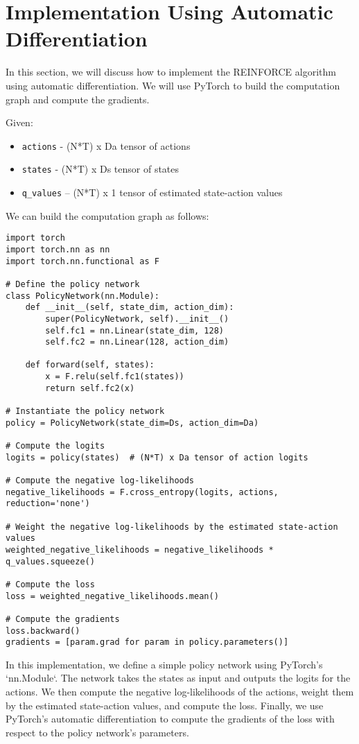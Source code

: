 \documentclass[12pt]{article}
\begin{document}
\section{Implementation Using Automatic Differentiation}

In this section, we will discuss how to implement the REINFORCE algorithm using automatic differentiation. We will use PyTorch to build the computation graph and compute the gradients.

Given:
\begin{itemize}
    \item \texttt{actions} - (N*T) x Da tensor of actions
    \item \texttt{states} - (N*T) x Ds tensor of states
    \item \texttt{q\_values} – (N*T) x 1 tensor of estimated state-action values
\end{itemize}

We can build the computation graph as follows:

\begin{verbatim}
import torch
import torch.nn as nn
import torch.nn.functional as F

# Define the policy network
class PolicyNetwork(nn.Module):
    def __init__(self, state_dim, action_dim):
        super(PolicyNetwork, self).__init__()
        self.fc1 = nn.Linear(state_dim, 128)
        self.fc2 = nn.Linear(128, action_dim)

    def forward(self, states):
        x = F.relu(self.fc1(states))
        return self.fc2(x)

# Instantiate the policy network
policy = PolicyNetwork(state_dim=Ds, action_dim=Da)

# Compute the logits
logits = policy(states)  # (N*T) x Da tensor of action logits

# Compute the negative log-likelihoods
negative_likelihoods = F.cross_entropy(logits, actions, reduction='none')

# Weight the negative log-likelihoods by the estimated state-action values
weighted_negative_likelihoods = negative_likelihoods * q_values.squeeze()

# Compute the loss
loss = weighted_negative_likelihoods.mean()

# Compute the gradients
loss.backward()
gradients = [param.grad for param in policy.parameters()]
\end{verbatim}

In this implementation, we define a simple policy network using PyTorch's `nn.Module`. The network takes the states as input and outputs the logits for the actions. We then compute the negative log-likelihoods of the actions, weight them by the estimated state-action values, and compute the loss. Finally, we use PyTorch's automatic differentiation to compute the gradients of the loss with respect to the policy network's parameters.
\end{document}
